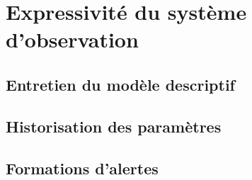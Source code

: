 \section{Expressivité du système d'observation}\label{sec:valid:domvision:requetes}
\subsection{Entretien du modèle descriptif}
\subsection{Historisation des paramètres}
\subsection{Formations d'alertes}
